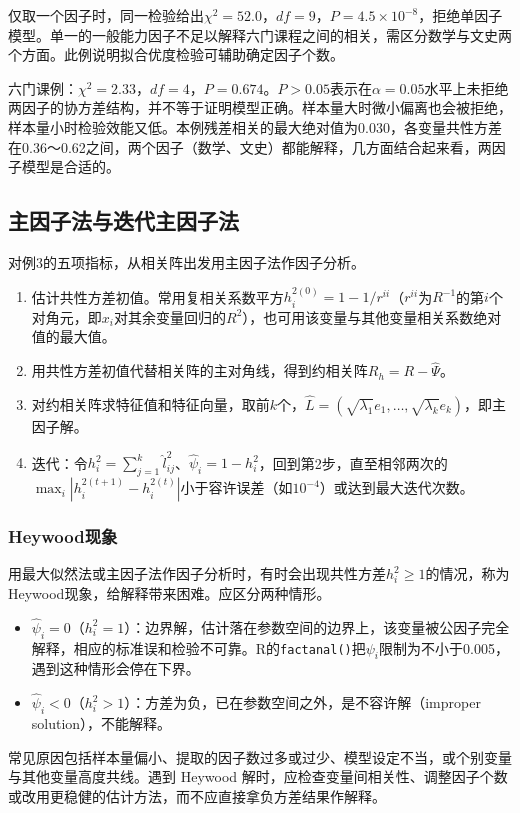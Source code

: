 仅取一个因子时，同一检验给出$\chi^2=52.0$，$df=9$，$P=4.5\times10^{-8}$，拒绝单因子模型。单一的一般能力因子不足以解释六门课程之间的相关，需区分数学与文史两个方面。此例说明拟合优度检验可辅助确定因子个数。

六门课例：$\chi^2=2.33$，$df=4$，$P=0.674$。$P>0.05$表示在$\alpha=0.05$水平上未拒绝两因子的协方差结构，并不等于证明模型正确。样本量大时微小偏离也会被拒绝，样本量小时检验效能又低。本例残差相关的最大绝对值为0.030，各变量共性方差在0.36～0.62之间，两个因子（数学、文史）都能解释，几方面结合起来看，两因子模型是合适的。
\subsection{主因子法与迭代主因子法}
对例3的五项指标，从相关阵出发用主因子法作因子分析。
\begin{enumerate}
\item 估计共性方差初值。常用复相关系数平方$h_i^{2(0)}=1-1/r^{ii}$（$r^{ii}$为$R^{-1}$的第$i$个对角元，即$x_i$对其余变量回归的$R^2$），也可用该变量与其他变量相关系数绝对值的最大值。
\item 用共性方差初值代替相关阵的主对角线，得到约相关阵$R_h=R-\widehat\Psi$。
\item 对约相关阵求特征值和特征向量，取前$k$个，$\widehat L=(\sqrt{\lambda_1}e_1,\ldots,\sqrt{\lambda_k}e_k)$，即主因子解。
\item 迭代：令$h_i^2=\sum_{j=1}^k\widehat l_{ij}^{2}$、$\widehat\psi_i=1-h_i^2$，回到第2步，直至相邻两次的$\max_i|h_i^{2(t+1)}-h_i^{2(t)}|$小于容许误差（如$10^{-4}$）或达到最大迭代次数。
\end{enumerate}
\subsubsection{Heywood现象}
用最大似然法或主因子法作因子分析时，有时会出现共性方差$h_i^2\geqslant1$的情况，称为Heywood现象，给解释带来困难。应区分两种情形。
\begin{itemize}
\item $\widehat\psi_i=0$（$h_i^2=1$）：边界解，估计落在参数空间的边界上，该变量被公因子完全解释，相应的标准误和检验不可靠。R的\texttt{factanal()}把$\psi_i$限制为不小于0.005，遇到这种情形会停在下界。
\item $\widehat\psi_i<0$（$h_i^2>1$）：方差为负，已在参数空间之外，是不容许解（improper solution），不能解释。
\end{itemize}
常见原因包括样本量偏小、提取的因子数过多或过少、模型设定不当，或个别变量与其他变量高度共线。遇到 Heywood 解时，应检查变量间相关性、调整因子个数或改用更稳健的估计方法，而不应直接拿负方差结果作解释。
